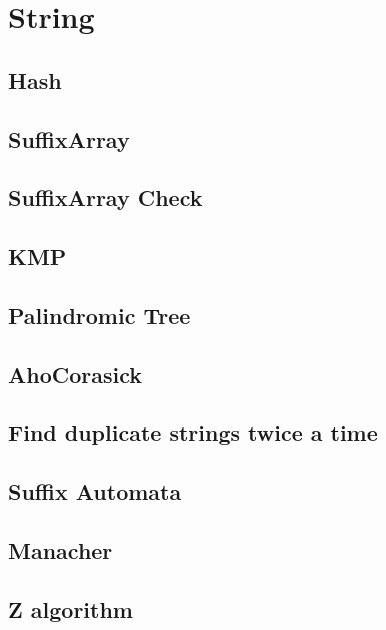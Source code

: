 \section{String}
\subsection{Hash}
\raggedbottom
\hrulefill
\subsection{SuffixArray}
\raggedbottom
\hrulefill
\subsection{SuffixArray Check}
\raggedbottom
\hrulefill
\subsection{KMP}
\raggedbottom
\hrulefill
\subsection{Palindromic Tree}
\raggedbottom
\hrulefill
\subsection{AhoCorasick}
\raggedbottom
\hrulefill
\subsection{Find duplicate strings twice a time}
\raggedbottom
\hrulefill
\subsection{Suffix Automata}
\raggedbottom
\hrulefill
\subsection{Manacher}
\raggedbottom
\hrulefill
\subsection{Z algorithm}
\raggedbottom
\hrulefill
